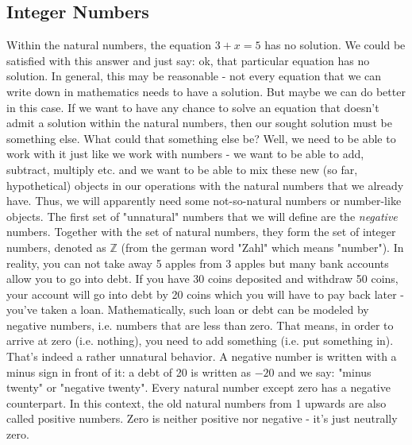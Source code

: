 
\subsection{Integer Numbers}
Within the natural numbers, the equation $3 + x = 5$ has no solution. We could be satisfied with this answer and just say: ok, that particular equation has no solution. In general, this may be reasonable - not every equation that we can write down in mathematics needs to have a solution. But maybe we can do better in this case. If we want to have any chance to solve an equation that doesn't admit a solution within the natural numbers, then our sought solution must be something else. What could that something else be? Well, we need to be able to work with it just like we work with numbers - we want to be able to add, subtract, multiply etc. and we want to be able to mix these new (so far, hypothetical) objects in our operations with the natural numbers that we already have. Thus, we will apparently need some not-so-natural numbers or number-like objects. The first set of "unnatural" numbers that we will define are the \emph{negative} numbers. Together with the set of natural numbers, they form the set of integer numbers, denoted as $\mathbb{Z}$ (from the german word "Zahl" which means "number"). In reality, you can not take away 5 apples from 3 apples but many bank accounts allow you to go into debt. If you have 30 coins deposited and withdraw 50 coins, your account will go into debt by 20 coins which you will have to pay back later - you've taken a loan. Mathematically, such loan or debt can be modeled by negative numbers, i.e. numbers that are less than zero. That means, in order to arrive at zero (i.e. nothing), you need to add something (i.e. put something in). That's indeed a rather unnatural behavior.  A negative number is written with a minus sign in front of it: a debt of 20 is written as $-20$ and we say: "minus twenty" or "negative twenty". Every natural number except zero has a negative counterpart. In this context, the old natural numbers from 1 upwards are also called positive numbers. Zero is neither positive nor negative - it's just neutrally zero. 


